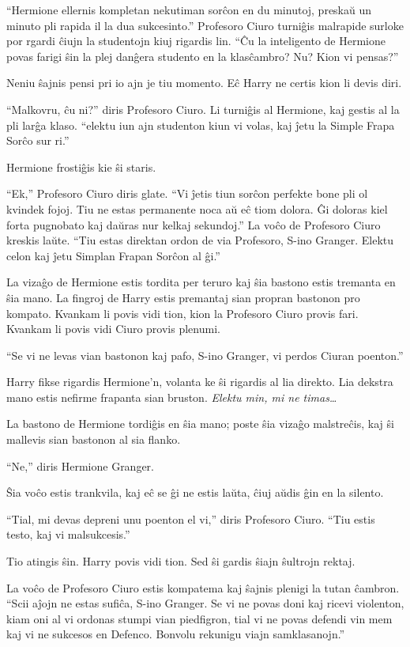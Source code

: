 ``Hermione ellernis kompletan nekutiman sorĉon en du minutoj, preskaŭ
un minuto pli rapida il la dua sukcesinto.'' Profesoro Ciuro turniĝis
malrapide surloke por rgardi ĉiujn la studentojn kiuj rigardis
lin. ``Ĉu la inteligento de Hermione povas farigi ŝin la plej danĝera
studento en la klasĉambro? Nu? Kion vi pensas?''

Neniu ŝajnis pensi pri io ajn je tiu momento. Eĉ Harry ne certis kion
li devis diri.

``Malkovru, ĉu ni?'' diris Profesoro Ciuro. Li turniĝis al Hermione,
kaj gestis al la pli larĝa klaso.  ``elektu iun ajn studenton kiun vi
volas, kaj ĵetu la Simple Frapa Sorĉo sur ri.''

Hermione frostiĝis kie ŝi staris.

``Ek,'' Profesoro Ciuro diris glate. ``Vi ĵetis tiun sorĉon perfekte
bone pli ol kvindek fojoj. Tiu ne estas permanente noca aŭ eĉ tiom
dolora. Ĝi doloras kiel forta pugnobato kaj daŭras nur kelkaj
sekundoj.'' La voĉo de Profesoro Ciuro kreskis laŭte. ``Tiu estas
direktan ordon de via Profesoro, S-ino Granger. Elektu celon kaj ĵetu
Simplan Frapan Sorĉon al ĝi.''

La vizaĝo de Hermione estis tordita per teruro kaj ŝia bastono estis
tremanta en ŝia mano. La fingroj de Harry estis premantaj sian propran
bastonon pro kompato. Kvankam li povis vidi tion, kion la Profesoro
Ciuro provis fari. Kvankam li povis vidi Ciuro provis plenumi.

``Se vi ne levas vian bastonon kaj pafo, S-ino Granger, vi perdos
Ciuran poenton.''

Harry fikse rigardis Hermione'n, volanta ke ŝi rigardis al lia
direkto. Lia dekstra mano estis nefirme frapanta sian
bruston. \emph{Elektu min, mi ne timas\ldots}

La bastono de Hermione tordiĝis en ŝia mano; poste ŝia vizaĝo
malstreĉis, kaj ŝi mallevis sian bastonon al sia flanko.

``Ne,'' diris Hermione Granger.

Ŝia voĉo estis trankvila, kaj eĉ se ĝi ne estis laŭta, ĉiuj aŭdis ĝin en la silento.

``Tial, mi devas depreni unu poenton el vi,'' diris Profesoro
Ciuro. ``Tiu estis testo, kaj vi malsukcesis.''

Tio atingis ŝin. Harry povis vidi tion. Sed ŝi gardis ŝiajn ŝultrojn rektaj.

La voĉo de Profesoro Ciuro estis kompatema kaj ŝajnis plenigi la tutan
ĉambron. ``Scii aĵojn ne estas sufiĉa, S-ino Granger. Se vi ne povas doni
kaj ricevi violenton, kiam oni al vi ordonas stumpi vian piedfigron, tial vi
ne povas defendi vin mem kaj vi ne sukcesos en Defenco. Bonvolu
rekunigu viajn samklasanojn.''

